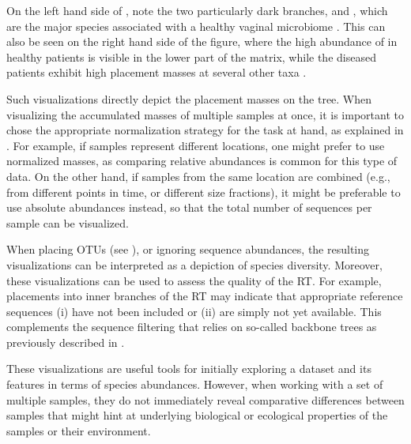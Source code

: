 On the left hand side of , note the two particularly dark branches, 
 and ,
which are the major species associated with a healthy vaginal microbiome \cite{Srinivasan2012}.
This can also be seen on the right hand side of the figure,
where the high abundance of  in healthy patients
is visible in the lower part of the matrix,
while the diseased patients exhibit high placement masses at several other taxa \cite{Srinivasan2012}.

Such visualizations directly depict the placement masses on the tree.
When visualizing the accumulated masses of multiple samples at once,
it is important to chose the appropriate normalization strategy for the task at hand,
as explained in .
For example, if samples represent different locations, one might prefer to use normalized masses,
as comparing relative abundances is common for this type of data.
On the other hand, if samples from the same location are combined
(e.g., from different points in time, or different size fractions),
it might be preferable to use absolute abundances instead,
so that the total number of sequences per sample can be visualized.

When placing OTUs (see ),
or ignoring sequence abundances, the resulting visualizations can be interpreted as a depiction of species diversity.
Moreover, these visualizations can be used to assess the quality of the \ac{RT}.
For example, placements into inner branches of the \ac{RT} may indicate that appropriate reference sequences
(i) have not been included or (ii) are simply not yet available.
This complements the sequence filtering that relies on so-called backbone trees
as previously described in .

These visualizations are useful tools for initially exploring a dataset and its features
in terms of species abundances.
However, when working with a set of multiple samples,
they do not immediately reveal comparative differences between samples
that might hint at underlying biological or ecological properties of the samples or their environment.

